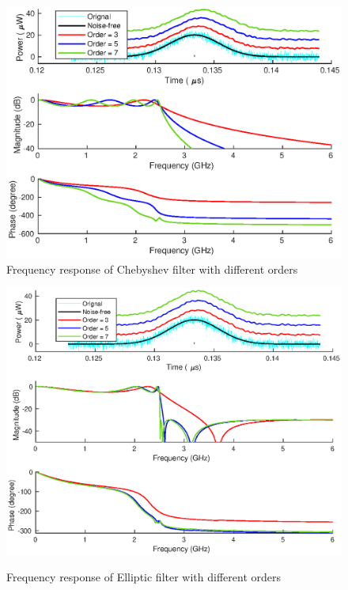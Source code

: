 %
\begin{figure}[t!p]
\centering
\includegraphics[width=1\textwidth]{figures/chapter_AFE/freq_response_cheby_diffOrder.eps}
\caption{Frequency response of Chebyshev filter with different orders}
\label{fig:AFE_freqResp_chebyr_order}
\end{figure}
\begin{figure}[t!p]
\centering
\includegraphics[width=1\textwidth]{figures/chapter_AFE/freq_response_elliptic_diffOrder.eps}
\caption{Frequency response of Elliptic filter with different orders}
\textbf{\label{fig:AFE_freqResp_ellip_order}}
\end{figure}
